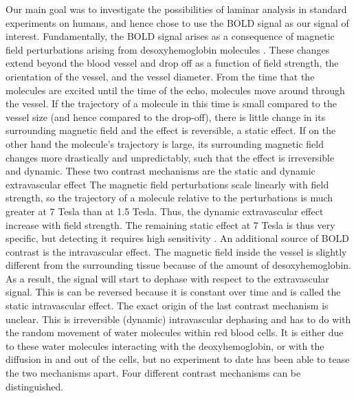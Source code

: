 Our main goal was to investigate the possibilities of laminar analysis in standard experiments on humans, and hence chose to use the BOLD signal as our signal of interest. Fundamentally, the BOLD signal arises as a consequence of magnetic field perturbations arising from desoxyhemoglobin molecules \cite{Norris2006}. These changes extend beyond the blood vessel and drop off as a function of field strength, the orientation of the vessel, and the vessel diameter. 
From the time that the molecules are excited until the time of the echo, molecules move around through the vessel. If the trajectory of a molecule in this time is small compared to the vessel size (and hence compared to the drop-off), there is little change in its surrounding magnetic field and the effect is reversible, a static effect. If on the other hand the molecule's trajectory is large, its surrounding magnetic field changes more drastically and unpredictably, such that the effect is irreversible and dynamic.
These two contrast mechanisms are the static and dynamic extravascular effect
The magnetic field perturbations scale linearly with field strength, so the trajectory of a molecule relative to the perturbations is much greater at 7 Tesla than at 1.5 Tesla. Thus, the dynamic extravascular effect increase with field strength. 
The remaining static effect at 7 Tesla is thus very specific, but detecting it requires high sensitivity \cite{Panchuelo2014}. 
An additional source of BOLD contrast is the intravascular effect. The magnetic field inside the vessel is slightly different from the surrounding tissue because of the amount of desoxyhemoglobin. As a result, the signal will start to dephase with respect to the extravascular signal. This is can be reversed because it is constant over time and is called the static intravascular effect. The exact origin of the last contrast mechanism is unclear. This is irreversible (dynamic) intravascular dephasing and has to do with the random movement of water molecules within red blood cells. It is either due to these water molecules interacting with the deoxyhemoglobin, or with the diffusion in and out of the cells, but no experiment to date has been able to tease the two mechanisms apart.
Four different contrast mechanisms can be distinguished.

